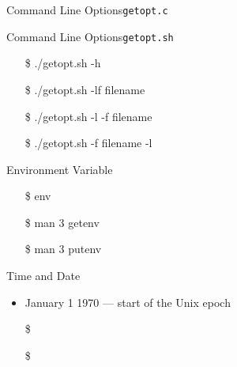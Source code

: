 \begin{frame}{Command Line Options}{\texttt{getopt.c}}
  \begin{center}
  \end{center}
  \qquad\qquad{}
\end{frame}

\begin{frame}{Command Line Options}{\texttt{getopt.sh}}
  \begin{center}
  \end{center}
  \ttfamily
  \begin{itemize}
  \item[\$] ./getopt.sh -h
  \item[\$] ./getopt.sh -lf filename
  \item[\$] ./getopt.sh -l -f filename
  \item[\$] ./getopt.sh -f filename -l
  \end{itemize}
\end{frame}

\begin{frame}{Environment Variable}
  \begin{minipage}{.5\linewidth}
    \begin{center}
    \end{center}
  \end{minipage}\quad
  \begin{minipage}{.45\linewidth}
  \ttfamily
  \begin{itemize}
  \item[\$] env
  \item[\$] man 3 getenv
  \item[\$] man 3 putenv
  \end{itemize}  
  \end{minipage}
\end{frame}


\begin{frame}{Time and Date}
  \begin{center}
  \end{center}
  \begin{itemize}
  \item January 1 1970 --- start of the Unix epoch
  \item[\$] 
  \item[\$] 
  \end{itemize}
\end{frame}

